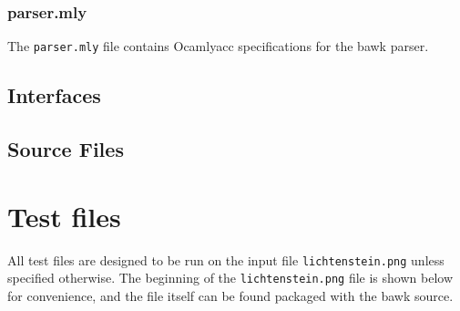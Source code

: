 \documentclass[letterpaper,11pt]{report}
\begin{document}
\subsubsection{parser.mly}
The \texttt{parser.mly} file contains Ocamlyacc specifications for the bawk parser.


\subsection{Interfaces}









\subsection{Source Files}








\section{Test files}
All test files are designed to be run on the input file \texttt{lichtenstein.png} unless specified otherwise.  The beginning of the \texttt{lichtenstein.png} file is shown below for convenience, and the file itself can be found packaged with the bawk source.
\end{document}

